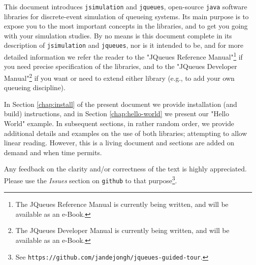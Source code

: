 This document introduces \lstinline|jsimulation|
  and \lstinline|jqueues|,
  open-source \lstinline|java|
  software libraries
  for discrete-event simulation of queueing systems.
Its main purpose is to expose you to the most
  important concepts in the libraries,
  and to get you going with your simulation studies.
By no means is this document complete
  in its description of \lstinline|jsimulation|
  and \lstinline|jqueues|,
  nor is it intended to be,
  and for more detailed information we refer the reader to the
  "JQueues Reference Manual"\footnote{
The JQueues Reference Manual is currently being written,
  and will be available as an e-Book.}
  if you need precise specification
  of the libraries, and to the "JQueues Developer Manual"\footnote{
  	The JQueues Developer Manual is currently being written,
  	and will be available as an e-Book.}
  if you want or need to extend either library
  (e.g., to add your own queueing discipline).

In Section \ref{chap:install} of the present document
  we provide installation (and build) instructions,
  and in Section \ref{chap:hello-world}
  we present our "Hello World" example.
In subsequent sections, in rather random order,
  we provide additional details and examples on
  the use of both libraries;
  attempting to allow linear reading.
However,
  this is a living document
  and sections are added on demand and when time permits.

Any feedback on the clarity and/or correctness of the text
  is highly appreciated.
Please use the {\em Issues\/} section on \lstinline|github| to that purpose\footnote{
  See \texttt{https://github.com/jandejongh/jqueues-guided-tour}.}.